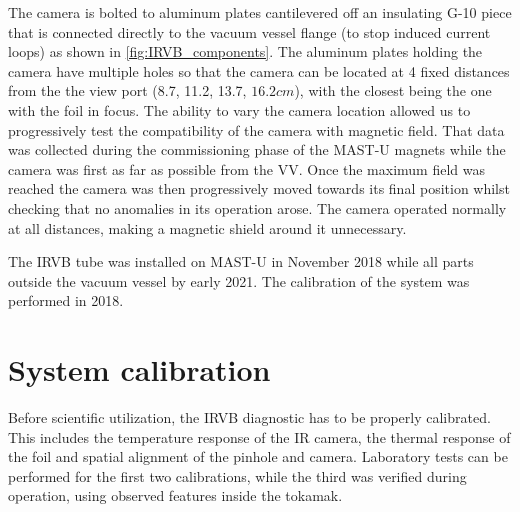 The camera is bolted to aluminum plates cantilevered off an insulating G-10 piece that is connected directly to the vacuum vessel flange (to stop induced current loops) as shown in \autoref{fig:IRVB_components}. The aluminum plates holding the camera have multiple holes so that the camera can be located at 4 fixed distances from the the view port (8.7, 11.2, 13.7, $16.2cm$), with the closest being the one with the foil in focus. The ability to vary the camera location allowed us to progressively test the compatibility of the camera with magnetic field. That data was collected during the commissioning phase of the MAST-U magnets while the camera was first as far as possible from the VV. Once the maximum field was reached the camera was then progressively moved towards its final position whilst checking that no anomalies in its operation arose. The camera operated normally at all distances, making a magnetic shield around it unnecessary.

The IRVB tube was installed on MAST-U in November 2018 while all parts outside the vacuum vessel by early 2021. The calibration of the system was performed in 2018.


\section{System calibration}\label{System calibration}
Before scientific utilization, the IRVB diagnostic has to be properly calibrated. This includes the temperature response of the IR camera, the thermal response of the foil and spatial alignment of the pinhole and camera. Laboratory tests can be performed for the first two calibrations, while the third was verified during operation, using observed features inside the tokamak.



